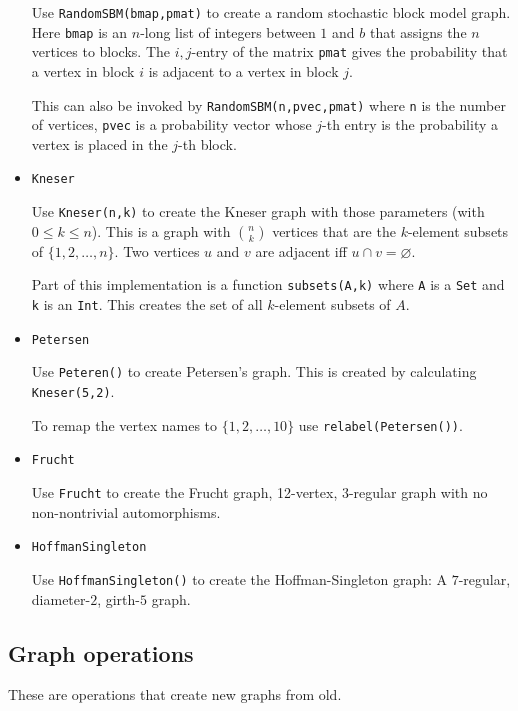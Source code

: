 \documentclass[oneside]{amsart}
\begin{document}
\begin{itemize}
  Use \verb|RandomSBM(bmap,pmat)| to create a random stochastic block
  model graph. Here \verb|bmap| is an $n$-long list of integers between
  $1$ and $b$ that assigns the $n$ vertices to blocks. The
  $i,j$-entry of the matrix \verb|pmat|
  gives the probability that a vertex in block $i$
  is adjacent to a vertex in block $j$.

  This can also be invoked by \verb|RandomSBM(n,pvec,pmat)| where
  \verb|n| is the number of vertices, \verb|pvec| is a probability vector
  whose $j$-th entry is the probability a vertex is placed in the $j$-th block.


\item \verb|Kneser|

  Use \verb|Kneser(n,k)| to create the Kneser graph with those
  parameters (with $0 \le k \le n$). This is a graph with $\binom nk$
  vertices that are the $k$-element subsets of $\{1,2,\ldots,n\}$. Two
  vertices $u$ and $v$ are adjacent iff $u \cap v = \varnothing$.

  Part of this implementation is a function \verb|subsets(A,k)| where
  \verb|A| is a \verb|Set| and \verb|k| is an \verb|Int|. This creates
  the set of all $k$-element subsets of $A$.


\item \verb|Petersen|

  Use \verb|Peteren()| to create Petersen's graph. This is created by
  calculating \verb|Kneser(5,2)|.

  To remap the vertex names to $\{1,2,\ldots,10\}$ use
  \verb|relabel(Petersen())|.

  \item \verb|Frucht|

    Use \verb|Frucht| to create the Frucht graph, 12-vertex, 3-regular graph with
    no non-nontrivial automorphisms.


  \item \verb|HoffmanSingleton|

    Use \verb|HoffmanSingleton()| to create the Hoffman-Singleton graph:
    A $7$-regular, diameter-$2$, girth-$5$ graph.

  \end{itemize}


\subsection*{Graph operations}
These are operations that create new graphs from old.
\end{document}
